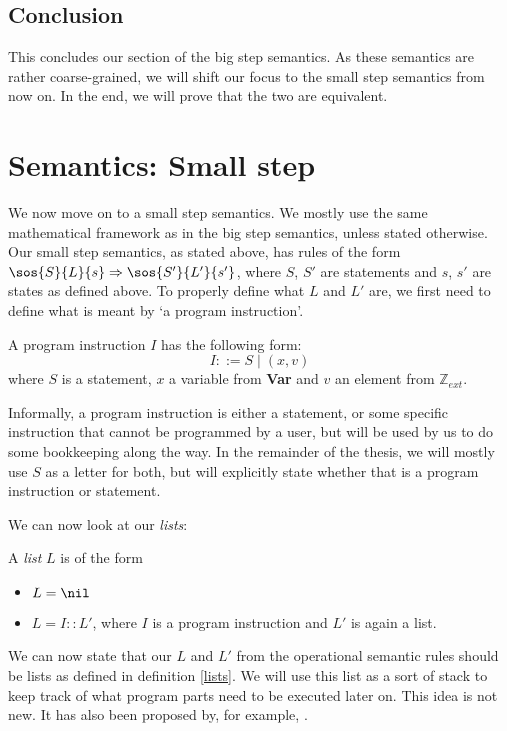 \subsection{Conclusion}
This concludes our section of the big step semantics. As these semantics are rather coarse-grained, we will shift our focus to the small step semantics from now on. In the end, we will prove that the two are equivalent.


\section{Semantics: Small step}
We now move on to a small step semantics. We mostly use the same mathematical framework as in the big step semantics, unless stated otherwise. Our small step semantics, as stated above, has rules of the form $\sos{S}{L}{s} \Rightarrow \sos{S'}{L'}{s'}$, where $S$, $S'$ are statements and $s$, $s'$ are states as defined above. To properly define what $L$ and $L'$ are, we first need to define what is meant by `a program instruction'. 

\begin{definition}
\label{programinstruction}
A program instruction $I$ has the following form:
$$I ::= S \mid (x,v)$$
where $S$ is a statement, $x$ a variable from \textbf{Var} and $v$ an element from $\mathbb{Z}_{ext}$.
\end{definition}

Informally, a program instruction is either a statement, or some specific instruction that cannot be programmed by a user, but will be used by us to do some bookkeeping along the way. In the remainder of the thesis, we will mostly use $S$ as a letter for both, but will explicitly state whether that is a program instruction or statement. 

We can now look at our \emph{lists}:

\begin{definition}
\label{lists}
A \emph{list} $L$ is of the form 
\begin{itemize}[noitemsep]
    \item $L = \nil$
    \item $L = I::L'$, where $I$ is a program instruction and $L'$ is again a list. 
\end{itemize}
\end{definition}

We can now state that our $L$ and $L'$ from the operational semantic rules should be lists as defined in definition \ref{lists}. We will use this list as a sort of stack to keep track of what program parts need to be executed later on. This idea is not new. It has also been proposed by, for example, \cite{appel2007cminor}. 

